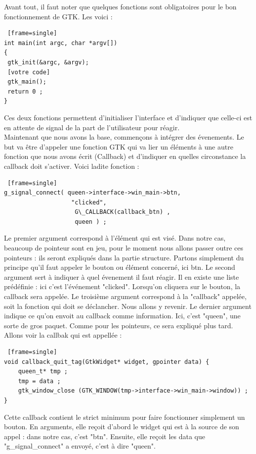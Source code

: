 \documentclass[11pt,french,a4paper]{report}
\begin{document}
Avant tout, il faut noter que quelques fonctions sont obligatoires pour le bon fonctionnement de GTK. Les voici : \\
\begin{lstlisting} [frame=single]
int main(int argc, char *argv[])     
{ 
 gtk_init(&argc, &argv); 
 [votre code] 
 gtk_main();
 return 0 ;
} 
\end{lstlisting}
Ces deux fonctions permettent d'initialiser l'interface et d'indiquer que celle-ci est en attente de signal
de la part de l'utilisateur pour réagir. \\
Maintenant que nous avons la base, commençons à intégrer des évenements.
Le but va être d'appeler une fonction GTK qui va lier un éléments à une autre fonction que nous avons écrit  (Callback) 
et d'indiquer en quelles circonstance la callback doit s'activer. Voici ladite fonction : 
\begin{lstlisting} [frame=single]
g_signal_connect( queen->interface->win_main->btn,
                   "clicked", 
                    G\_CALLBACK(callback_btn) ,
                    queen ) ; 
\end{lstlisting}
Le premier argument correspond à l'élément qui est visé. Dans notre cas, beaucoup de pointeur sont en jeu,
pour le moment nous allons passer outre ces pointeurs : ils seront expliqués dans la partie structure. 
Partons simplement du principe qu'il faut appeler le bouton ou élément concerné, ici btn.  
Le second argument sert à indiquer à quel évenement il faut réagir. Il en existe une liste prédéfinie : ici
c'est l'événement "clicked". Lorsqu'on cliquera sur le bouton, la callback sera appelée. 
Le troisième argument correspond à la "callback" appelée, soit la fonction qui doit se déclancher. Nous allons 
y revenir.
Le dernier argument indique ce qu'on envoit au callback comme information. Ici, c'est "queen", une sorte de 
gros paquet. Comme pour les pointeurs, ce sera expliqué plus tard. \\

Allons voir la callbak qui est appellée : 
\begin{lstlisting} [frame=single]
void callback_quit_tag(GtkWidget* widget, gpointer data) {                                       
    queen_t* tmp ;                                                                             
    tmp = data ;                                                                                
    gtk_window_close (GTK_WINDOW(tmp->interface->win_main->window)) ; 
} 
\end{lstlisting}
Cette callback contient le strict minimum pour faire fonctionner simplement un bouton.
En arguments, elle reçoit d'abord le widget qui est à la source de son appel : dans notre cas, c'est "btn". 
Ensuite, elle reçoit les data que "g\_signal\_connect" a envoyé, c'est à dire "queen". \\
\end{document}
